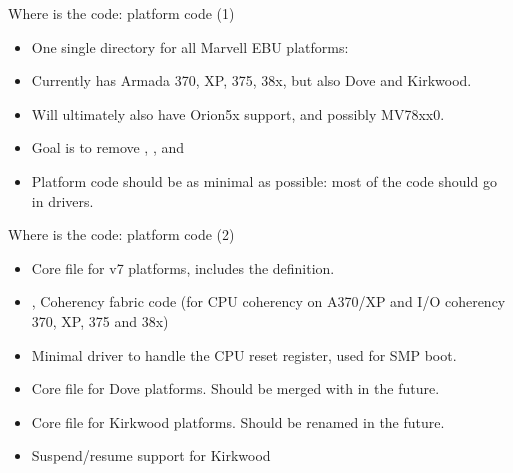 \begin{frame}{Where is the code: platform code (1)}

\begin{itemize}
\item One single directory for all Marvell EBU platforms:
\item Currently has Armada 370, XP, 375, 38x, but also Dove and
  Kirkwood.
\item Will ultimately also have Orion5x support, and possibly MV78xx0.
\item Goal is to remove , ,
   and 
\item Platform code should be as minimal as possible: most of the code
  should go in drivers.
\end{itemize}

\end{frame}

\begin{frame}{Where is the code: platform code (2)}

\begin{itemize}
\item {} Core file for v7 platforms, includes the
   definition.
\item {},  Coherency fabric code
  (for CPU coherency on A370/XP and I/O coherency 370, XP, 375 and
  38x)
\item {} Minimal driver to handle the CPU reset
  register, used for SMP boot.
\item {} Core file for Dove platforms. Should be merged with
   in the future.
\item {} Core file for Kirkwood platforms. Should be
  renamed  in the future.
\item {} Suspend/resume support for Kirkwood
\end{itemize}

\end{frame}

